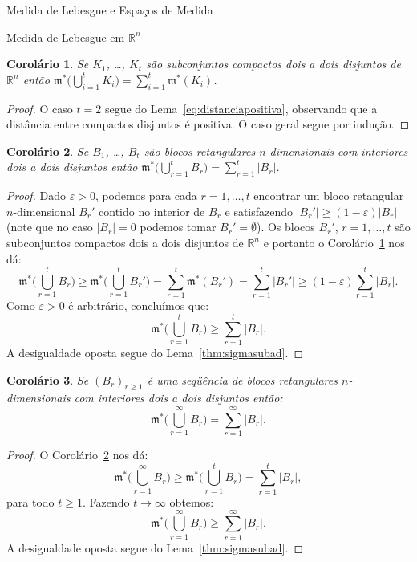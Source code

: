 \documentclass[oneside,final,11pt]{amsbook}
\newcommand{\R}{\mathds R}
\newcommand{\leb}{\mathfrak m}
\theoremstyle{remark}\newtheorem{exercise}{Exercício}[chapter]
\theoremstyle{remark}\newtheorem{*exercise}[exercise]{\hbox to 0pt{\hskip 0pt minus 1fil*}Exercício}
\theoremstyle{definition}\newtheorem{exdefin}{Definição}[chapter]
\theoremstyle{plain}\newtheorem{teo}{Teorema}[section]
\theoremstyle{plain}\newtheorem{lem}[teo]{Lema}
\theoremstyle{plain}\newtheorem{prop}[teo]{Proposição}
\theoremstyle{plain}\newtheorem{cor}[teo]{Corolário}
\theoremstyle{definition}\newtheorem{defin}[teo]{Definição}
\theoremstyle{remark}\newtheorem{rem}[teo]{Observação}
\theoremstyle{definition}\newtheorem{notation}[teo]{Notação}
\theoremstyle{definition}\newtheorem{convention}[teo]{Convenção}
\theoremstyle{definition}\newtheorem{example}[teo]{Exemplo}
\numberwithin{section}{chapter}
\numberwithin{equation}{section}
\begin{document}
\begin{chapter}{Medida de Lebesgue e Espaços de Medida}
\begin{section}[Medida de Lebesgue em $\R^n$]{Medida de Lebesgue em ${\R^n}$}
\begin{cor}\label{thm:medidacompactosdisjuntos}
Se $K_1$, \dots, $K_t$ são subconjuntos compactos dois a dois disjuntos de $\R^n$ então $\leb^*\big(\bigcup_{i=1}^tK_i\big)
=\sum_{i=1}^t\leb^*(K_i)$.
\end{cor}
\begin{proof}
O caso $t=2$ segue do Lema~\ref{eq:distanciapositiva}, observando que a distância entre compactos disjuntos é positiva.
O caso geral segue por indução.
\end{proof}

\begin{cor}\label{thm:aditivafinitablocos}
Se $B_1$, \dots, $B_t$ são blocos retangulares $n$-di\-men\-sio\-nais com interiores dois a dois disjuntos então
$\leb^*\big(\bigcup_{r=1}^tB_r\big)=\sum_{r=1}^t\vert B_r\vert$.
\end{cor}
\begin{proof}
Dado $\varepsilon>0$, podemos para cada $r=1,\ldots,t$ encontrar um bloco retangular $n$-dimensional $B_r'$ contido
no interior de $B_r$ e satisfazendo $\vert B_r'\vert\ge(1-\varepsilon)\vert B_r\vert$ (note que no caso $\vert B_r\vert=0$ podemos
tomar $B_r'=\emptyset$). Os blocos $B_r'$, $r=1,\ldots,t$ são subconjuntos compactos dois a dois disjuntos de $\R^n$ e portanto
o Corolário~\ref{thm:medidacompactosdisjuntos} nos dá:
\[\leb^*\Big(\bigcup_{r=1}^tB_r\Big)\ge\leb^*\Big(\bigcup_{r=1}^tB_r'\Big)=\sum_{r=1}^t\leb^*(B_r')
=\sum_{r=1}^t\vert B_r'\vert\ge(1-\varepsilon)\sum_{r=1}^t\vert B_r\vert.\]
Como $\varepsilon>0$ é arbitrário, concluímos que:
\[\leb^*\Big(\bigcup_{r=1}^tB_r\Big)\ge\sum_{r=1}^t\vert B_r\vert.\]
A desigualdade oposta segue do Lema~\ref{thm:sigmasubad}.
\end{proof}

\begin{cor}\label{thm:corinfinitosblocos}
Se $(B_r)_{r\ge1}$ é uma seqüência de blocos retangulares $n$-dimensionais com interiores dois a dois disjuntos então:
\[\leb^*\Big(\bigcup_{r=1}^\infty B_r\Big)=\sum_{r=1}^\infty\vert B_r\vert.\]
\end{cor}
\begin{proof}
O Corolário~\ref{thm:aditivafinitablocos} nos dá:
\[\leb^*\Big(\bigcup_{r=1}^\infty B_r\Big)\ge\leb^*\Big(\bigcup_{r=1}^t B_r\Big)=\sum_{r=1}^t\vert B_r\vert,\]
para todo $t\ge1$. Fazendo $t\to\infty$ obtemos:
\[\leb^*\Big(\bigcup_{r=1}^\infty B_r\Big)\ge\sum_{r=1}^\infty\vert B_r\vert.\]
A desigualdade oposta segue do Lema~\ref{thm:sigmasubad}.
\end{proof}


\end{section}
\end{chapter}
\end{document}
